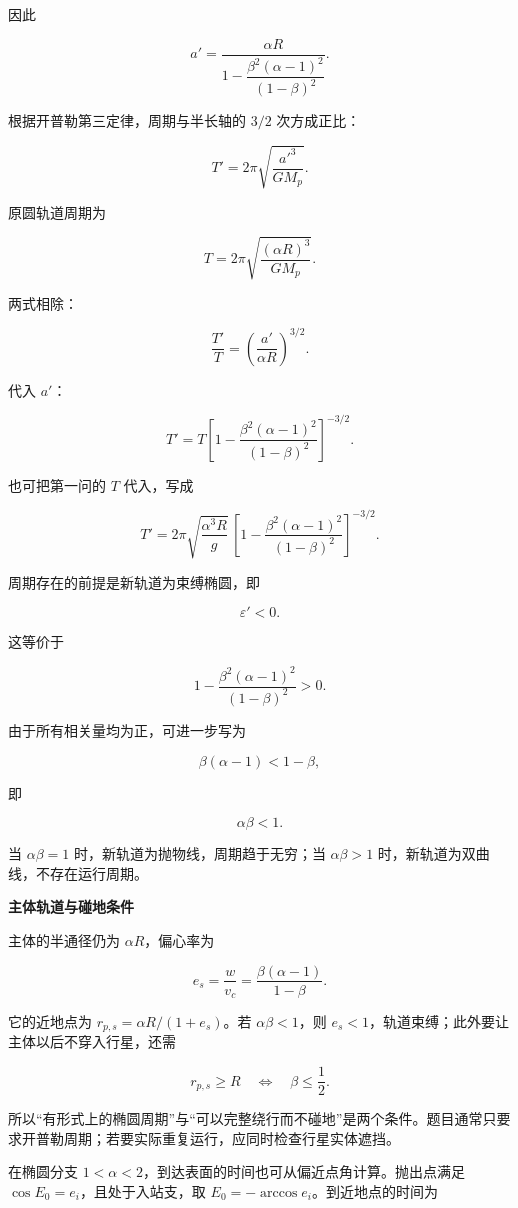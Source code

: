 \documentclass[12pt,a4paper,UTF8]{ctexart}
\begin{document}
因此

\[a'=
\frac{\alpha R}{
1-\dfrac{\beta^2(\alpha-1)^2}{(1-\beta)^2}
}.\]

根据开普勒第三定律，周期与半长轴的 \(3/2\) 次方成正比：

\[T'=2\pi\sqrt{\frac{a'^3}{GM_{\!p}}}.\]

原圆轨道周期为

\[T=2\pi\sqrt{\frac{(\alpha R)^3}{GM_{\!p}}}.\]

两式相除：

\[\frac{T'}{T}
=\left(\frac{a'}{\alpha R}\right)^{3/2}.\]

代入 \(a'\)：

\[\boxed{
T'
=T\left[
1-\frac{\beta^2(\alpha-1)^2}{(1-\beta)^2}
\right]^{-3/2}
}.\]

也可把第一问的 \(T\) 代入，写成

\[\boxed{
T'
=2\pi\sqrt{\frac{\alpha^3R}{g}}\,
\left[
1-\frac{\beta^2(\alpha-1)^2}{(1-\beta)^2}
\right]^{-3/2}
}.\]

周期存在的前提是新轨道为束缚椭圆，即

\[\varepsilon'<0.\]

这等价于

\[1-\frac{\beta^2(\alpha-1)^2}{(1-\beta)^2}>0.\]

由于所有相关量均为正，可进一步写为

\[\beta(\alpha-1)<1-\beta,\]

即

\[\boxed{\alpha\beta<1}.\]

当 \(\alpha\beta=1\) 时，新轨道为抛物线，周期趋于无穷；当
\(\alpha\beta>1\) 时，新轨道为双曲线，不存在运行周期。

\textbf{主体轨道与碰地条件}

主体的半通径仍为 \(\alpha R\)，偏心率为

\[e_s=\frac{w}{v_c}=\frac{\beta(\alpha-1)}{1-\beta}.\]

它的近地点为 \(r_{p,s}=\alpha R/(1+e_s)\)。若 \(\alpha\beta<1\)，则
\(e_s<1\)，轨道束缚；此外要让主体以后不穿入行星，还需

\[r_{p,s}\ge R\quad\Longleftrightarrow\quad\beta\le\frac12.\]

所以``有形式上的椭圆周期''与``可以完整绕行而不碰地''是两个条件。题目通常只要求开普勒周期；若要实际重复运行，应同时检查行星实体遮挡。

在椭圆分支 \(1<\alpha<2\)，到达表面的时间也可从偏近点角计算。抛出点满足
\(\cos E_0=e_i\)，且处于入站支，取
\(E_0=-\arccos e_i\)。到近地点的时间为
\end{document}

